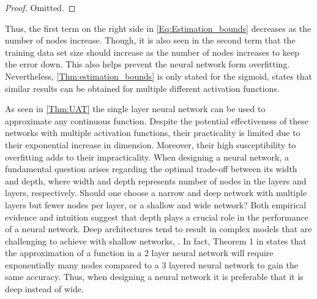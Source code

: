 \begin{proof}
Omitted.
\end{proof}

Thus, the first term on the right side in \eqref{Eq:Estimation_bounds} decreases as the number of nodes increase. Though, it is also seen in the second term that the training data set size should increase as the number of nodes increases to keep the error down. This also helps prevent the neural network form overfitting. Nevertheless, \autoref{Thm:estimation_bounds} is only stated for the sigmoid, \citep[s. 117]{Barron} states that similar results can be obtained for multiple different activation functions. 

As seen in \autoref{Thm:UAT} the single layer neural network can be used to approximate any continuous function. Despite the potential effectiveness of these networks with multiple activation functions, their practicality is limited due to their exponential increase in dimension. Moreover, their high susceptibility to overfitting adds to their impracticality. When designing a neural network, a fundamental question arises regarding the optimal trade-off between its width and depth, where width and depth represents number of nodes in the layers and layers, respectively. Should one choose a narrow and deep network with multiple layers but fewer nodes per layer, or a shallow and wide network? Both empirical evidence and intuition suggest that depth plays a crucial role in the performance of a neural network. Deep architectures tend to result in complex models that are challenging to achieve with shallow networks, \citep{REOS}. In fact, Theorem 1 in \citep{REOS} states that the approximation of a function in a 2 layer neural network will require exponentially many nodes compared to a 3 layered neural network to gain the same accuracy. Thus, when designing a neural network it is preferable that it is deep instead of wide. 